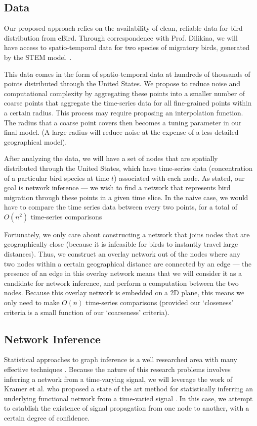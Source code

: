 \documentclass[11pt]{article}
\begin{document}
\begin{multicols}{2}
\subsection{Data}
Our proposed approach relies on the availability of clean, reliable data for bird distribution from eBird. Through correspondence with Prof. Dilikina, we will have access to spatio-temporal data for two species of migratory birds, generated by the STEM model~\cite{stem}. 

This data comes in the form of spatio-temporal data at hundreds of thousands of points distributed through the United States. We propose to reduce noise and computational complexity by aggregating these points into a smaller number of coarse points that aggregate the time-series data for all fine-grained points within a certain radius. This process may require proposing an interpolation function. The radius that a coarse point covers then becomes a tuning parameter in our final model. (A large radius will reduce noise at the expense of a less-detailed geographical model). 

After analyzing the data, we will have a set of nodes that are spatially distributed through the United States, which have time-series data (concentration of a particular bird species at time $t$) associated with each node. As stated, our goal is network inference --- we wish to find a network that represents bird migration through these points in a given time slice. In the naive case, we would have to compare the time series data between every two points, for a total of $O(n^2)$ time-series comparisons

Fortunately, we only care about constructing a network that joins nodes that are geographically close (because it is infeasible for birds to instantly travel large distances). Thus, we construct an overlay network out of the nodes where any two nodes within a certain geographical distance are connected by an edge --- the presence of an edge in this overlay network means that we will consider it as a candidate for network inference, and perform a computation between the two nodes. Because this overlay network is embedded on a 2D plane, this means we only need to make $O(n)$ time-series comparisons (provided our `closeness' criteria is a small function of our `coarseness' criteria). 

\subsection{Network Inference} 
Statistical approaches to graph inference is a well researched area with many effective techniques \cite{AlbertMechanics}. Because the nature of this research problems involves inferring a network from a time-varying signal, we will leverage the work of Kramer et al. who proposed a state of the art method for statistically inferring an underlying functional network from a time-varied signal \cite{kramer}. In this case, we attempt to establish the existence of signal propagation from one node to another, with a certain degree of confidence. 


\end{multicols}
\end{document}
